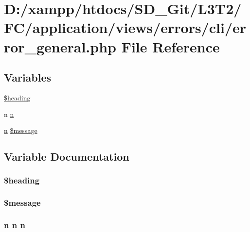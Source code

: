 \hypertarget{cli_2error__general_8php}{}\section{D\+:/xampp/htdocs/\+S\+D\+\_\+\+Git/\+L3\+T2/\+F\+C/application/views/errors/cli/error\+\_\+general.php File Reference}
\label{cli_2error__general_8php}
\subsection*{Variables}
\begin{DoxyCompactItemize}
\item 
\hyperlink{cli_2error__general_8php_a196169be7715d466e3310388b096598c}{\$heading}
\item 
n \hyperlink{cli_2error__general_8php_ace0fd03cd383f20ce6ea63247a207294}{n}
\item 
\hyperlink{cli_2error__general_8php_ace0fd03cd383f20ce6ea63247a207294}{n} \hyperlink{cli_2error__general_8php_aaba2b6aee423b3b5e46000f90b4c8c7f}{\$message}
\end{DoxyCompactItemize}


\subsection{Variable Documentation}
\hypertarget{cli_2error__general_8php_a196169be7715d466e3310388b096598c}{}
\subsubsection[{\$heading}]{\setlength{\rightskip}{0pt plus 5cm}\$heading}\label{cli_2error__general_8php_a196169be7715d466e3310388b096598c}
\hypertarget{cli_2error__general_8php_aaba2b6aee423b3b5e46000f90b4c8c7f}{}
\subsubsection[{\$message}]{ \$message}\label{cli_2error__general_8php_aaba2b6aee423b3b5e46000f90b4c8c7f}
\hypertarget{cli_2error__general_8php_ace0fd03cd383f20ce6ea63247a207294}{}
\subsubsection[{n}]{\setlength{\rightskip}{0pt plus 5cm}n n n}\label{cli_2error__general_8php_ace0fd03cd383f20ce6ea63247a207294}
